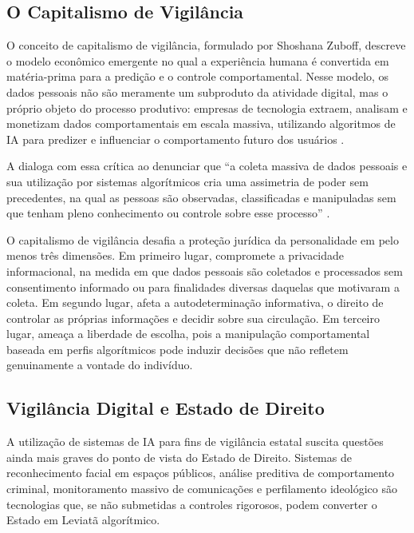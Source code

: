 \subsection{O Capitalismo de Vigilância}
\label{subsec:capitalismo-vigilancia}

O conceito de capitalismo de vigilância, formulado por Shoshana Zuboff, descreve o modelo econômico emergente no qual a experiência humana é convertida em matéria-prima para a predição e o controle comportamental. Nesse modelo, os dados pessoais não são meramente um subproduto da atividade digital, mas o próprio objeto do processo produtivo: empresas de tecnologia extraem, analisam e monetizam dados comportamentais em escala massiva, utilizando algoritmos de IA para predizer e influenciar o comportamento futuro dos usuários \cite{Zuboff2019SC}.

A \MH{} dialoga com essa crítica ao denunciar que ``a coleta massiva de dados pessoais e sua utilização por sistemas algorítmicos cria uma assimetria de poder sem precedentes, na qual as pessoas são observadas, classificadas e manipuladas sem que tenham pleno conhecimento ou controle sobre esse processo'' \cite{LeaoXIV2026MH}.

O capitalismo de vigilância desafia a proteção jurídica da personalidade em pelo menos três dimensões. Em primeiro lugar, compromete a privacidade informacional, na medida em que dados pessoais são coletados e processados sem consentimento informado ou para finalidades diversas daquelas que motivaram a coleta. Em segundo lugar, afeta a autodeterminação informativa, o direito de controlar as próprias informações e decidir sobre sua circulação. Em terceiro lugar, ameaça a liberdade de escolha, pois a manipulação comportamental baseada em perfis algorítmicos pode induzir decisões que não refletem genuinamente a vontade do indivíduo.

\subsection{Vigilância Digital e Estado de Direito}
\label{subsec:vigilancia-estado-direito}

A utilização de sistemas de IA para fins de vigilância estatal suscita questões ainda mais graves do ponto de vista do Estado de Direito. Sistemas de reconhecimento facial em espaços públicos, análise preditiva de comportamento criminal, monitoramento massivo de comunicações e perfilamento ideológico são tecnologias que, se não submetidas a controles rigorosos, podem converter o Estado em Leviatã algorítmico.

